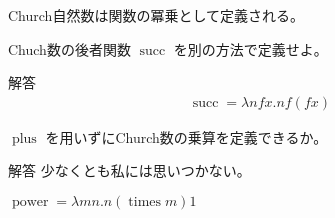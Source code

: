 Church自然数は関数の冪乗として定義される。

\begin{jexercise*}[5.2.2]
  Chuch数の後者関数 $\operatorname{succ}$ を別の方法で定義せよ。
\end{jexercise*}
\begin{itembox}[l]{解答}
  \begin{align*}
    \operatorname{succ} = \lambda n f x. n f (f x)
  \end{align*}
\end{itembox}

\begin{jexercise*}[5.2.3]
  $\operatorname{plus}$ を用いずにChurch数の乗算を定義できるか。
\end{jexercise*}
\begin{itembox}[l]{解答}
  少なくとも私には思いつかない。
\end{itembox}

\begin{jexercise*}[3.2.4]
  $\operatorname{power} = \lambda m n. n (\operatorname{times} m) 1$
\end{jexercise*}
